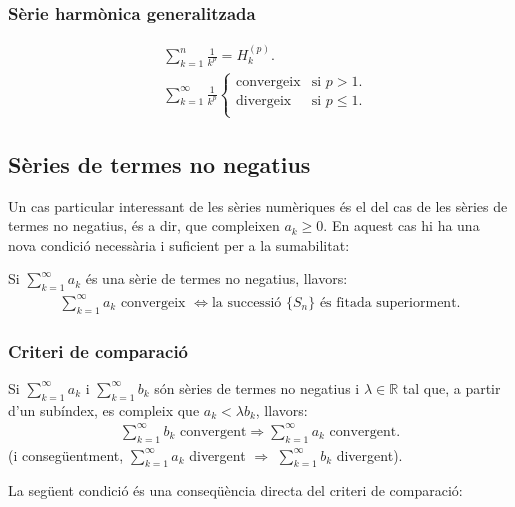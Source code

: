 \subsubsection*{Sèrie harmònica generalitzada}
\begin{align} 
    & \sum\limits_{k=1}^{n} \frac{1}{k^{p}} = H_{k}^{(p)}. \\
    & \sum\limits_{k=1}^{\infty} \frac{1}{k^{p}}
    \begin{cases} 
        \text{convergeix} & \text{si } p > 1. \\ 
        \text{divergeix} & \text{si } p \leq 1. \\
    \end{cases} 
\end{align}

\subsection{Sèries de termes no negatius}
Un cas particular interessant de les sèries numèriques és el del cas de les sèries de termes no negatius, és a dir, que compleixen $a_{k} \geq 0$. En aquest cas hi ha una nova condició necessària i suficient per a la sumabilitat:

Si $\sum_{k=1}^{\infty} a_{k}$ és una sèrie de termes no negatius, llavors:
\begin{align}
    \sum\limits_{k=1}^{\infty} a_{k} \text{ convergeix } \Leftrightarrow \text{la successió } \{S_{n}\} \text{ és fitada superiorment.}
\end{align}

\subsubsection*{Criteri de comparació}
Si $\sum_{k=1}^{\infty} a_{k}$ i $\sum_{k=1}^{\infty} b_{k}$ són sèries de termes no negatius i $\lambda \in \mathbb{R}$ tal que, a partir d'un subíndex, es compleix que $a_{k} < \lambda b_{k}$, llavors:
\begin{align}
    \sum\limits_{k=1}^{\infty} b_{k} \text{ convergent} \Rightarrow \sum\limits_{k=1}^{\infty} a_{k} \text{ convergent}.
\end{align}
(i consegüentment, $\sum\limits_{k=1}^{\infty} a_{k}$ divergent $\Rightarrow$ $\sum\limits_{k=1}^{\infty} b_{k}$ divergent).

La següent condició és una conseqüència directa del criteri de comparació:

